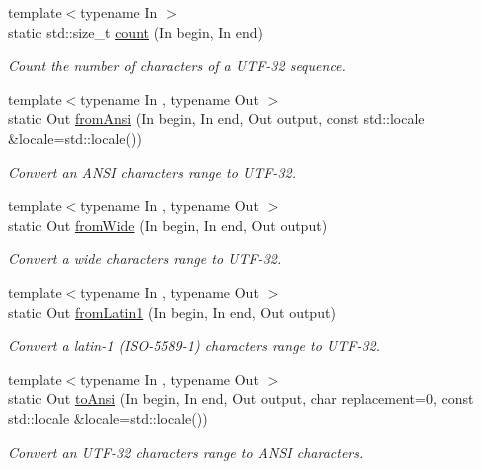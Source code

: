 \begin{DoxyCompactItemize}
{\footnotesize template$<$typename In $>$ }\\static std\-::size\-\_\-t \hyperlink{classburn_1_1_utf_3_0132_01_4_a6b7211327e499f48b9978ea5aa665ed0}{count} (In begin, In end)
\begin{DoxyCompactList}\small\item\em Count the number of characters of a U\-T\-F-\/32 sequence. \end{DoxyCompactList}\item 
{\footnotesize template$<$typename In , typename Out $>$ }\\static Out \hyperlink{classburn_1_1_utf_3_0132_01_4_a9f691dc136e944975036addcb07fbbbd}{from\-Ansi} (In begin, In end, Out output, const std\-::locale \&locale=std\-::locale())
\begin{DoxyCompactList}\small\item\em Convert an A\-N\-S\-I characters range to U\-T\-F-\/32. \end{DoxyCompactList}\item 
{\footnotesize template$<$typename In , typename Out $>$ }\\static Out \hyperlink{classburn_1_1_utf_3_0132_01_4_aa8a7dc3ff10ee843bc9f3dac740a03fe}{from\-Wide} (In begin, In end, Out output)
\begin{DoxyCompactList}\small\item\em Convert a wide characters range to U\-T\-F-\/32. \end{DoxyCompactList}\item 
{\footnotesize template$<$typename In , typename Out $>$ }\\static Out \hyperlink{classburn_1_1_utf_3_0132_01_4_a4523f0e9db47fec51c4ca1bffead1415}{from\-Latin1} (In begin, In end, Out output)
\begin{DoxyCompactList}\small\item\em Convert a latin-\/1 (I\-S\-O-\/5589-\/1) characters range to U\-T\-F-\/32. \end{DoxyCompactList}\item 
{\footnotesize template$<$typename In , typename Out $>$ }\\static Out \hyperlink{classburn_1_1_utf_3_0132_01_4_ab41e090af0a5278c7a145908159910d6}{to\-Ansi} (In begin, In end, Out output, char replacement=0, const std\-::locale \&locale=std\-::locale())
\begin{DoxyCompactList}\small\item\em Convert an U\-T\-F-\/32 characters range to A\-N\-S\-I characters. \end{DoxyCompactList}\item 

\end{DoxyCompactItemize}

